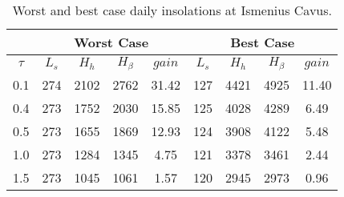 \begin{table}[h]
  \footnotesize
  \centering
  \caption{Worst and best case daily insolations at Ismenius Cavus.}
  \label{tab:insolation-ismenius-cavus-clear-and-dusty-days}
  \begin{tabular}{c|c|c|c|c|c|c|c|c|}
    \cline{2-9}
    \multicolumn{1}{l|}{} & \multicolumn{4}{c|}{Worst Case} & \multicolumn{4}{c|}{Best Case} \\ \hline
    \multicolumn{1}{|c|}{$\tau$} & $L_{s}$ & $H_{h}$ & $H_{\beta}$ & $gain$ & $L_{s}$ & $H_{h}$ & $H_{\beta}$ & $gain$ \\ \hline
    \multicolumn{1}{|c|}{0.1} & 274 & 2102 & 2762 & 31.42 & 127 & 4421 & 4925 & 11.40 \\ \hline
    \multicolumn{1}{|c|}{0.4} & 273 & 1752 & 2030 & 15.85 & 125 & 4028 & 4289 & 6.49 \\ \hline
    \multicolumn{1}{|c|}{0.5} & 273 & 1655 & 1869 & 12.93 & 124 & 3908 & 4122 & 5.48 \\ \hline
    \multicolumn{1}{|c|}{1.0} & 273 & 1284 & 1345 & 4.75 & 121 & 3378 & 3461 & 2.44 \\ \hline
    \multicolumn{1}{|c|}{1.5} & 273 & 1045 & 1061 & 1.57 & 120 & 2945 & 2973 & 0.96 \\ \hline
  \end{tabular}
\end{table}
